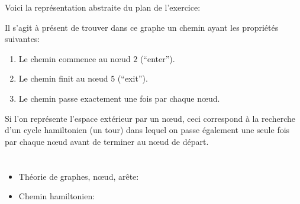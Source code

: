 {{\begin{samepage}
Voici la représentation abstraite du plan de l’exercice:

\nopagebreak

{\centering%
\par}
\end{samepage}

Il s’agit à présent de trouver dans ce graphe un chemin ayant les propriétés suivantes:

\begin{enumerate}
  \item Le chemin commence au nœud $2$ (“enter”).
  \item Le chemin finit au nœud $5$ (“exit”).
  \item Le chemin passe exactement une fois par chaque nœud.
\end{enumerate}

Si l’on représente l’espace extérieur par un nœud, ceci correspond à la recherche d’un cycle hamiltonien (un tour) dans lequel on passe également une seule fois par chaque nœud avant de terminer au nœud de départ.

{\centering%
\par}



\section*{\BrochureWebsitesAndKeywords}
{\raggedright
\begin{itemize}
  \item Théorie de graphes, nœud, arête: \href{https://fr.wikipedia.org/wiki/Th\%C3\%A9orie_des_graphes}{}
  \item Chemin hamiltonien: \href{https://fr.wikipedia.org/wiki/Graphe_hamiltonien}{}
\end{itemize}


}

}{}

}
